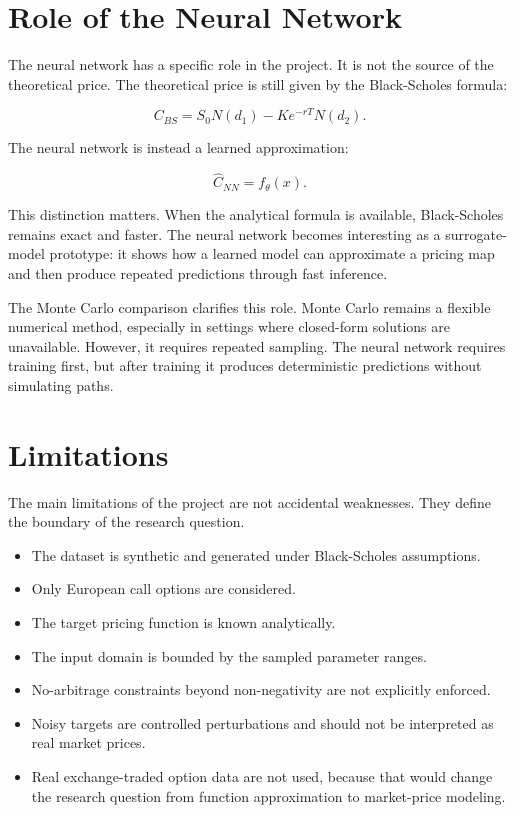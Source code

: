 \section{Role of the Neural Network}

The neural network has a specific role in the project.
It is not the source of the theoretical price.
The theoretical price is still given by the Black-Scholes formula:

\begin{equation}
    C_{BS}
    =
    S_0 N(d_1)
    -
    K e^{-rT} N(d_2).
\end{equation}

The neural network is instead a learned approximation:

\begin{equation}
    \hat{C}_{NN}
    =
    f_\theta(x).
\end{equation}

This distinction matters.
When the analytical formula is available, Black-Scholes remains exact and faster.
The neural network becomes interesting as a surrogate-model prototype: it shows how a learned model can approximate a pricing map and then produce repeated predictions through fast inference.

The Monte Carlo comparison clarifies this role.
Monte Carlo remains a flexible numerical method, especially in settings where closed-form solutions are unavailable.
However, it requires repeated sampling.
The neural network requires training first, but after training it produces deterministic predictions without simulating paths.

\section{Limitations}

The main limitations of the project are not accidental weaknesses.
They define the boundary of the research question.

\begin{itemize}
    \item The dataset is synthetic and generated under Black-Scholes assumptions.
    \item Only European call options are considered.
    \item The target pricing function is known analytically.
    \item The input domain is bounded by the sampled parameter ranges.
    \item No-arbitrage constraints beyond non-negativity are not explicitly enforced.
    \item Noisy targets are controlled perturbations and should not be interpreted as real market prices.
    \item Real exchange-traded option data are not used, because that would change the research question from function approximation to market-price modeling.
\end{itemize}


